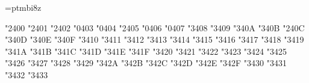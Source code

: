 \setmathsizes[10/7/5]

\ifx\tenbi\undefined \font\tenbi=ptmbi8z \relax \fi
\normalmath    %
\mitvariables  %


\def\amsafam{4} \def\amsbfam{5} 


\mathchardef \boxdot   "2\amsafam 00
\mathchardef \boxplus   "2\amsafam 01
\mathchardef \boxtimes   "2\amsafam 02
\mathchardef \square   "0\amsafam 03
\mathchardef \blacksquare   "0\amsafam 04
\mathchardef \centerdot   "2\amsafam 05
\mathchardef \lozenge   "0\amsafam 06
\mathchardef \blacklozenge   "0\amsafam 07
\mathchardef \circlearrowright   "3\amsafam 08
\mathchardef \circlearrowleft   "3\amsafam 09
\mathchardef \rightleftharpoons   "3\amsafam 0A
\mathchardef \leftrightharpoons   "3\amsafam 0B
\mathchardef \boxminus   "2\amsafam 0C
\mathchardef \Vdash   "3\amsafam 0D
\mathchardef \Vvdash   "3\amsafam 0E
\mathchardef \vDash   "3\amsafam 0F
\mathchardef \twoheadrightarrow   "3\amsafam 10
\mathchardef \twoheadleftarrow   "3\amsafam 11
\mathchardef \leftleftarrows   "3\amsafam 12
\mathchardef \rightrightarrows   "3\amsafam 13
\mathchardef \upuparrows   "3\amsafam 14
\mathchardef \downdownarrows   "3\amsafam 15
\mathchardef \upharpoonright   "3\amsafam 16
\mathchardef \downharpoonright   "3\amsafam 17
\mathchardef \upharpoonleft   "3\amsafam 18
\mathchardef \downharpoonleft   "3\amsafam 19
\mathchardef \rightarrowtail   "3\amsafam 1A
\mathchardef \leftarrowtail   "3\amsafam 1B
\mathchardef \leftrightarrows   "3\amsafam 1C
\mathchardef \rightleftarrows   "3\amsafam 1D
\mathchardef \Lsh   "3\amsafam 1E
\mathchardef \Rsh   "3\amsafam 1F
\mathchardef \rightsquigarrow   "3\amsafam 20
\mathchardef \leftrightsquigarrow   "3\amsafam 21
\mathchardef \looparrowleft   "3\amsafam 22
\mathchardef \looparrowright   "3\amsafam 23
\mathchardef \circeq   "3\amsafam 24
\mathchardef \succsim   "3\amsafam 25
\mathchardef \gtrsim   "3\amsafam 26
\mathchardef \gtrapprox   "3\amsafam 27
\mathchardef \multimap   "3\amsafam 28
\mathchardef \therefore   "3\amsafam 29
\mathchardef \because   "3\amsafam 2A
\mathchardef \doteqdot   "3\amsafam 2B
\mathchardef \triangleq   "3\amsafam 2C
\mathchardef \precsim   "3\amsafam 2D
\mathchardef \lesssim   "3\amsafam 2E
\mathchardef \lessapprox   "3\amsafam 2F
\mathchardef \eqslantless   "3\amsafam 30
\mathchardef \eqslantgtr   "3\amsafam 31
\mathchardef \curlyeqprec   "3\amsafam 32
\mathchardef \curlyeqsucc   "3\amsafam 33
